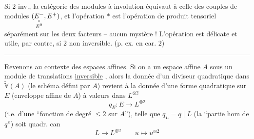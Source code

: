 Si $2$ inv., la catégorie des modules à involution équivaut à celle des  couples de modules $(\underset{\substack{\shortparallel\\ E^0}}{E^-},E^+)$, et l'opération $*$ est l'opération de produit tensoriel séparément sur les deux facteurs  -- aucun mystère ! L'opération est délicate et utile, par contre, si $2$ non inversible. (p. ex. en car. $2$)

\begin{center}\rule{1.8em}{0.4pt}\end{center}

Revenons au contexte des espaces affines. Si on a un espace affine $A$ sous un module de translations \uline{inversible} , alors la donnée d'un diviseur quadratique dans $\check{\mathbb V}(A)$ (le schéma   défini par $A$) revient à la donnée d'une forme quadratique sur $E$ (enveloppe affine de $A$) à valeurs dans $L^{\otimes2}$
\[
q_E:E\longrightarrow L^{\otimes2}
\]
(i.e. d'une ``fonction   de degré $\leq2$ sur $A$''), telle que $q_L=q\mid L$ (la ``partie hom de $q$'') soit   quadr. can
\[
L\longrightarrow L^{\otimes2}\qquad u\longmapsto u^{\otimes2}
\]

